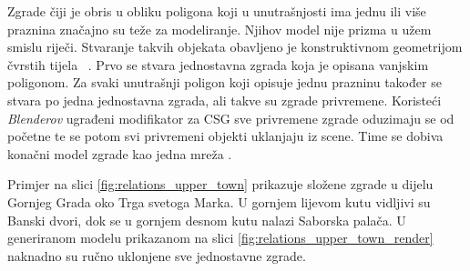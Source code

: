 \documentclass[times, utf8, zavrsni, numeric]{fer}
\begin{document}
		Zgrade čiji je obris u obliku poligona koji u unutrašnjosti ima jednu ili više praznina značajno su teže za modeliranje.
		Njihov model nije prizma u užem smislu riječi.
		Stvaranje takvih objekata obavljeno je konstruktivnom geometrijom čvrstih tijela ~\cite{pandzic:virtualna}.
		Prvo se stvara jednostavna zgrada koja je opisana vanjskim poligonom.
		Za svaki unutrašnji poligon koji opisuje jednu prazninu također se stvara po jedna jednostavna zgrada, ali takve su zgrade privremene.
		Koristeći \textit{Blenderov} ugrađeni modifikator za CSG  sve privremene zgrade oduzimaju se od početne te se potom svi privremeni objekti uklanjaju iz scene.
		Time se dobiva konačni model zgrade kao jedna mreža .
		
		Primjer na slici \ref{fig:relations_upper_town} prikazuje složene zgrade u dijelu Gornjeg Grada oko Trga svetoga Marka.
		U gornjem lijevom kutu vidljivi su Banski dvori, dok se u gornjem desnom kutu nalazi Saborska palača.
		U generiranom modelu prikazanom na slici \ref{fig:relations_upper_town_render} naknadno su ručno uklonjene sve jednostavne zgrade.
	
\end{document}
